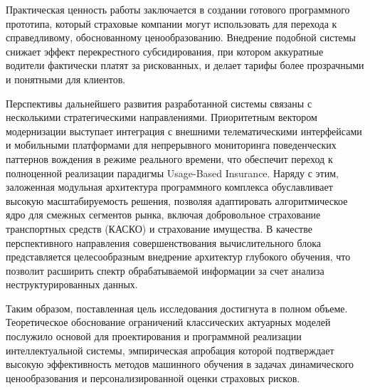 Практическая ценность работы заключается в создании готового программного прототипа, который страховые компании могут использовать для перехода к справедливому, обоснованному ценообразованию. Внедрение подобной системы снижает эффект перекрестного субсидирования, при котором аккуратные водители фактически платят за рискованных, и делает тарифы более прозрачными и понятными для клиентов.

Перспективы дальнейшего развития разработанной системы связаны с несколькими стратегическими направлениями. Приоритетным вектором модернизации выступает интеграция с внешними телематическими интерфейсами и мобильными платформами для непрерывного мониторинга поведенческих паттернов вождения в режиме реального времени, что обеспечит переход к полноценной реализации парадигмы Usage-Based Insurance. Наряду с этим, заложенная модульная архитектура программного комплекса обуславливает высокую масштабируемость решения, позволяя адаптировать алгоритмическое ядро для смежных сегментов рынка, включая добровольное страхование транспортных средств (КАСКО) и страхование имущества. В качестве перспективного направления совершенствования вычислительного блока представляется целесообразным внедрение архитектур глубокого обучения, что позволит расширить спектр обрабатываемой информации за счет анализа неструктурированных данных.

Таким образом, поставленная цель исследования достигнута в полном объеме. Теоретическое обоснование ограничений классических актуарных моделей послужило основой для проектирования и программной реализации интеллектуальной системы, эмпирическая апробация которой подтверждает высокую эффективность методов машинного обучения в задачах динамического ценообразования и персонализированной оценки страховых рисков.
